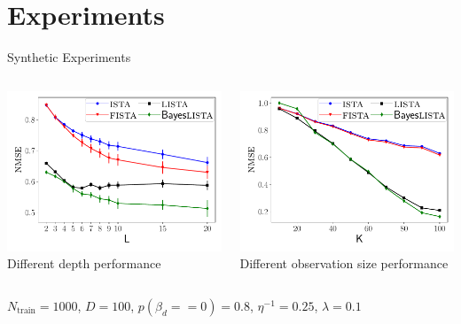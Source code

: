 \documentclass[9pt]{beamer}
\begin{document}
\section{Experiments}
\begin{frame}{Synthetic Experiments}
  \centering
  \begin{block}{}
    \begin{columns}
      \begin{column}{0.5\textwidth}
        \centering
        \includegraphics[width=0.75\columnwidth]{graphics/synthetic_number_of_layers/nmse_validation} \\
        Different depth performance
      \end{column}
      \begin{column}{0.5\textwidth}
        \centering
        \includegraphics[width=0.75\columnwidth]{graphics/synthetic_undersampling/nmse_validation} \\
        Different observation size performance
      \end{column}
    \end{columns}
  \end{block}
  $N_\text{train} = 1000$, $D = 100$, $p(\beta_d==0) = 0.8$, $\eta^{-1} = 0.25$, $\lambda=0.1$
\end{frame}
\end{document}
